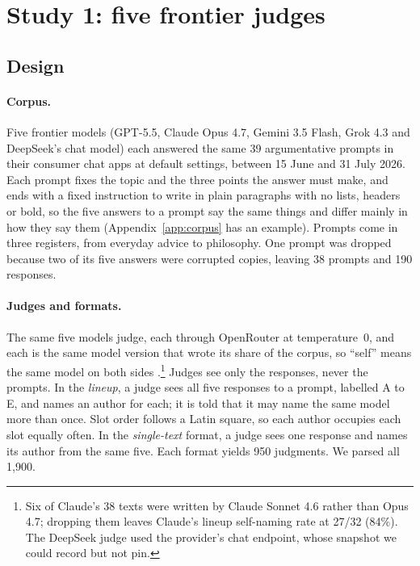 \section{Study 1: five frontier judges}
\label{sec:frontier}

\subsection{Design}
\paragraph{Corpus.} Five frontier models (GPT-5.5, Claude Opus 4.7, Gemini
3.5 Flash, Grok 4.3 and DeepSeek's chat model) each answered the same 39
argumentative prompts in their consumer chat apps at default settings,
between 15 June and 31 July 2026. Each prompt fixes the topic and the three
points the answer must make, and ends with a fixed instruction to write in
plain paragraphs with no lists, headers or bold, so the five answers to a
prompt say the same things and differ mainly in how they say them
(Appendix~\ref{app:corpus} has an example). Prompts come in three registers,
from everyday advice to philosophy. One prompt was dropped because two of its
five answers were corrupted copies, leaving 38 prompts and 190 responses.

\paragraph{Judges and formats.} The same five models judge, each through
OpenRouter at temperature~0, and each is the same model version that wrote
its share of the corpus, so ``self'' means the same model on both sides
\citep{panickssery2024selfpreference}.\footnote{Six of Claude's 38 texts were
written by Claude Sonnet 4.6 rather than Opus 4.7; dropping them leaves
Claude's lineup self-naming rate at 27/32 (84\%). The DeepSeek judge used the
provider's chat endpoint, whose snapshot we could record but not pin.}
Judges see only the responses, never the prompts. In the \emph{lineup}, a
judge sees all five responses to a prompt, labelled A to E, and names an
author for each; it is told that it may name the same model more than once.
Slot order follows a Latin square, so each author occupies each slot equally
often. In the \emph{single-text} format, a judge sees one response and names
its author from the same five. Each format yields 950 judgments. We parsed
all 1,900.

